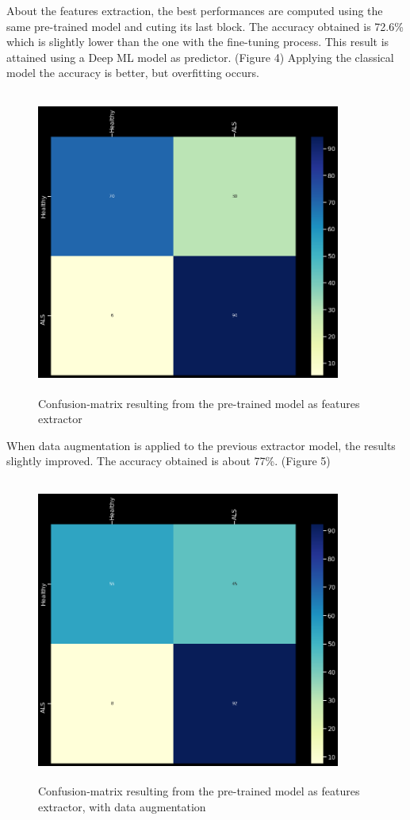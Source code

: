 \newpage
About the features extraction, the best performances are computed using the same pre-trained model and cuting its last block. The accuracy obtained is 72.6\% which is slightly lower than the one with the fine-tuning process. This result is attained using a Deep ML model as predictor. (Figure 4) Applying the classical model the accuracy is better, but overfitting occurs. 
\begin{figure}[H]
\centering
\caption{Confusion-matrix resulting from the pre-trained model as features extractor}
\includegraphics[width=10cm, height=10cm]{extractor_model_results}
\end{figure}

\newpage
When data augmentation is applied to the previous extractor model, the results slightly improved. The accuracy obtained is about 77\%. (Figure 5)
\begin{figure}[H]
\centering
\caption{Confusion-matrix resulting from the pre-trained model as features extractor, with data augmentation}
\includegraphics[width=10cm, height=10cm]{extractor_data_augmentation_model_results}
\end{figure}


